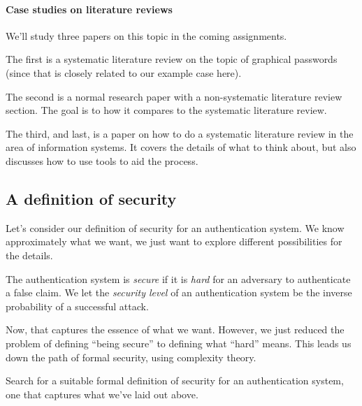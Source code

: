 \paragraph{Case studies on literature reviews}

We'll study three papers on this topic in the coming assignments.

The first\autocite{GraphicalPasswordsSurvey} is a systematic literature review 
on the topic of graphical passwords (since that is closely related to our 
example case here).

The second\autocite{OfPasswordsAndPeople} is a normal research paper with a 
non-systematic literature review section.
The goal is to how it compares to the systematic literature review.

The third, and last, is a paper on how to do a systematic literature review in 
the area of information systems\autocite{SLRinIS}.
It covers the details of what to think about, but also discusses how to use 
tools to aid the process.

\subsection{A definition of security}

Let's consider our definition of security for an authentication system.
We know approximately what we want, we just want to explore different 
possibilities for the details.

\begin{frame}
\begin{definition}
  The authentication system is \emph{secure} if it is \emph{hard} for an 
  adversary to authenticate a false claim.
  We let the \emph{security level} of an authentication system be the inverse 
  probability of a successful attack.
\end{definition}
\end{frame}

Now, that captures the essence of what we want.
However, we just reduced the problem of defining \enquote{being secure} to 
defining what \enquote{hard} means.
This leads us down the path of formal security, \eg using complexity theory.

\begin{exercise}
  Search for a suitable formal definition of security for an authentication 
  system, one that captures what we've laid out above.
\end{exercise}

